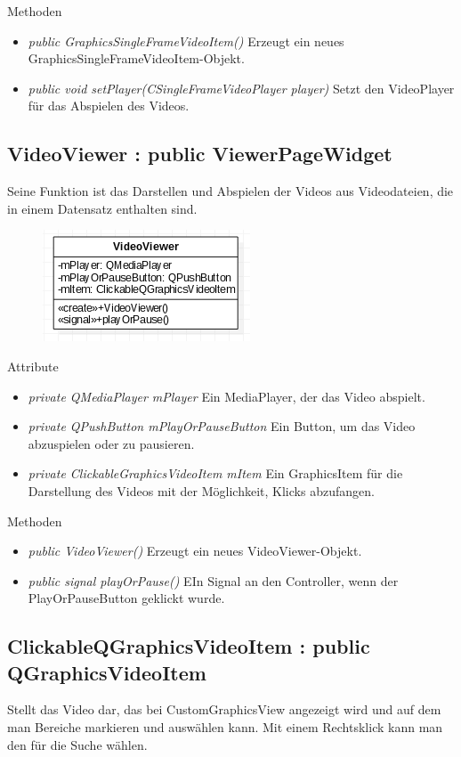 Methoden
\begin{itemize}
	\item\textit{public GraphicsSingleFrameVideoItem()} 
	Erzeugt ein neues GraphicsSingleFrameVideoItem-Objekt.
	\item\textit{public void setPlayer(CSingleFrameVideoPlayer player)} 
	Setzt den VideoPlayer für das Abspielen des Videos.
\end{itemize}

\subsection*{VideoViewer : public ViewerPageWidget}
Seine Funktion ist das Darstellen und Abspielen der Videos aus Videodateien, die in einem Datensatz enthalten sind.

\begin{figure}[H]
	\centering
	\includegraphics[scale=0.5]{img/Klassendiagramm/Klassen/View/VideoViewer}
	\label{fig:videoViewer}
\end{figure}

Attribute
\begin{itemize}
	\item\textit{private QMediaPlayer mPlayer} 
	Ein MediaPlayer, der das Video abspielt. 
	\item\textit{private QPushButton mPlayOrPauseButton} 
	Ein Button, um das Video abzuspielen oder zu pausieren.
	\item\textit{private ClickableGraphicsVideoItem mItem} 
	Ein GraphicsItem für die Darstellung des Videos mit der Möglichkeit, Klicks abzufangen.     
\end{itemize}
\pagebreak
Methoden
\begin{itemize}
	\item\textit{public VideoViewer()} 
	Erzeugt ein neues VideoViewer-Objekt.
	\item\textit{public signal playOrPause()} 
	EIn Signal an den Controller, wenn der PlayOrPauseButton geklickt wurde.
\end{itemize} 

\subsection*{ClickableQGraphicsVideoItem : public QGraphicsVideoItem}
Stellt das Video dar, das bei CustomGraphicsView angezeigt wird und auf dem man Bereiche markieren und  auswählen kann. Mit einem Rechtsklick kann man den  für die Suche wählen.


